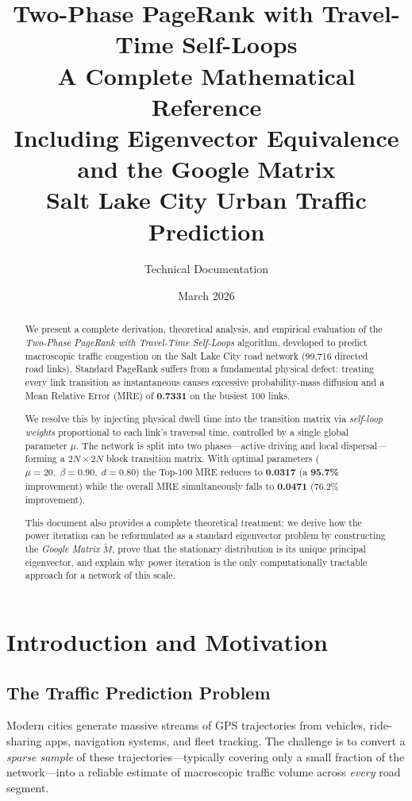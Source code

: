 \documentclass[12pt,a4paper]{article}
\title{%
  \textbf{Two-Phase PageRank with Travel-Time Self-Loops}\\[4pt]
  \large A Complete Mathematical Reference\\[2pt]
  \normalsize Including Eigenvector Equivalence and the Google Matrix\\[2pt]
  \small Salt Lake City Urban Traffic Prediction
}
\author{Technical Documentation}
\date{March 2026}
\theoremstyle{definition}
\theoremstyle{plain}
\begin{document}
\maketitle
\begin{abstract}
We present a complete derivation, theoretical analysis, and empirical evaluation of the
\emph{Two-Phase PageRank with Travel-Time Self-Loops} algorithm, developed to predict
macroscopic traffic congestion on the Salt Lake City road network (99{,}716 directed road
links). Standard PageRank suffers from a fundamental physical defect: treating every
link transition as instantaneous causes excessive probability-mass diffusion and a Mean
Relative Error (MRE) of \textbf{0.7331} on the busiest 100 links.

We resolve this by injecting physical dwell time into the transition matrix via
\emph{self-loop weights} proportional to each link's traversal time, controlled by a single
global parameter $\mu$. The network is split into two phases---active driving and local
dispersal---forming a $2N\!\times\!2N$ block transition matrix. With optimal parameters
($\mu=20,\;\beta=0.90,\;d=0.80$) the Top-100 MRE reduces to \textbf{0.0317}
(a \textbf{95.7\%} improvement) while the overall MRE simultaneously falls to
\textbf{0.0471} (76.2\% improvement).

This document also provides a complete theoretical treatment: we derive how the power
iteration can be reformulated as a standard eigenvector problem by constructing the
\emph{Google Matrix} $\widetilde{M}$, prove that the stationary distribution is its unique
principal eigenvector, and explain why power iteration is the only computationally
tractable approach for a network of this scale.
\end{abstract}

\tableofcontents
\newpage

\section{Introduction and Motivation}

\subsection{The Traffic Prediction Problem}

Modern cities generate massive streams of GPS trajectories from vehicles, ride-sharing
apps, navigation systems, and fleet tracking. The challenge is to convert a \emph{sparse
sample} of these trajectories---typically covering only a small fraction of the
network---into a reliable estimate of macroscopic traffic volume across \emph{every} road
segment.
\end{document}

